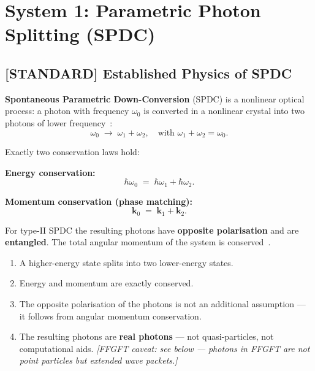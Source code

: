 \section{System 1: Parametric Photon Splitting (SPDC)}
\label{sec:spdc}

\subsection{[STANDARD] Established Physics of SPDC}

\textbf{Spontaneous Parametric Down-Conversion} (SPDC) is a
nonlinear optical process: a photon with frequency $\omega_0$
is converted in a nonlinear crystal into two photons
of lower frequency~\cite{Burnham1970}:
\begin{equation}
  \omega_0 \;\longrightarrow\; \omega_1 + \omega_2,
  \quad \text{with } \omega_1 + \omega_2 = \omega_0.
\end{equation}

Exactly two conservation laws hold:

\textbf{Energy conservation:}
\begin{equation}
  \hbar\omega_0 \;=\; \hbar\omega_1 + \hbar\omega_2.
\end{equation}

\textbf{Momentum conservation (phase matching):}
\begin{equation}
  \mathbf{k}_0 \;=\; \mathbf{k}_1 + \mathbf{k}_2.
\end{equation}

For type-II SPDC the resulting photons have
\textbf{opposite polarisation} and are \textbf{entangled}.
The total angular momentum of the system is conserved~\cite{Kwiat1995}.

\begin{keyresult}
\begin{enumerate}
  \item A higher-energy state splits into two
    lower-energy states.
  \item Energy and momentum are exactly conserved.
  \item The opposite polarisation of the photons
    is not an additional assumption --- it follows from
    angular momentum conservation.
  \item The resulting photons are \textbf{real photons}
    --- not quasi-particles, not computational aids.
    \emph{[FFGFT caveat: see below --- photons in FFGFT
    are not point particles but extended wave packets.]}
\end{enumerate}
\end{keyresult}

